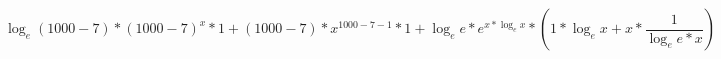 \documentclass[a4paper]{article}
\begin{document}
\[
\log_{e}\left(1000-7\right)*\left(1000-7\right)^{x}*1+\left(1000-7\right)*x^{1000-7-1}*1+\log_{e}e*e^{x*\log_{e}x}*\left(1*\log_{e}x+x*\frac{1}{\log_{e}e*x}\right)
\]
\end{document}
